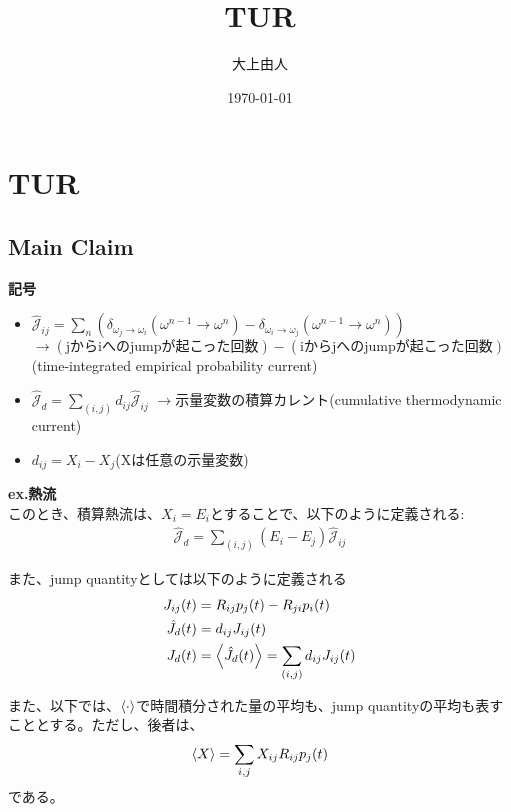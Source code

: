 \documentclass[a4paper,11pt]{jsarticle}
\numberwithin{equation}{section}
\begin{document}
\title{TUR}
\author{大上由人}
\date{\today}
\maketitle

\section{TUR}
\subsection{Main Claim}
\textbf{記号}
\begin{itemize}
    \item $\hat{\mathcal{J}}_{ij} = \sum_{n} (\delta_{\omega_j \to \omega_i}(\omega^{n-1}\to \omega^n) - \delta_{\omega_i \to \omega_j}(\omega^{n-1}\to \omega^n))$\\
$\to (\text{jからiへのjumpが起こった回数})-(\text{iからjへのjumpが起こった回数})$(time-integrated empirical probability current)\\
    \item $\hat{\mathcal{J}}_{d} = \sum_{(i,j)} d_{ij} \hat{\mathcal{J}}_{ij}$
$\to$示量変数の積算カレント(cumulative thermodynamic current)
    \item $d_{ij} = X_i - X_j$(Xは任意の示量変数)
\end{itemize}

\textbf{ex.熱流}\\
このとき、積算熱流は、$X_i = E_i$とすることで、以下のように定義される:
\begin{align}
    \hat{\mathcal{J}}_{d} = \sum_{(i,j)} (E_i - E_j) \hat{\mathcal{J}}_{ij}
\end{align}

また、jump quantityとしては以下のように定義される\\
\begin{align}
    {J}_{ij}(t) &= R_{ij}p_j(t) - R_{ji}p_i(t)\\
    \hat{J}_{d}(t) &= d_{ij} {J}_{ij}(t)\\
    J_{d}(t) &= \ev{\hat{J}_{d}(t)} = \sum_{(i,j)} d_{ij} {J}_{ij}(t)
\end{align}

また、以下では、$\ev{\cdot}$で時間積分された量の平均も、jump quantityの平均も表すこととする。ただし、後者は、
\begin{align}
    \ev{X} = \sum_{i,j} X_{ij} R_{ij}p_j(t)
\end{align}
である。\\
\end{document}
